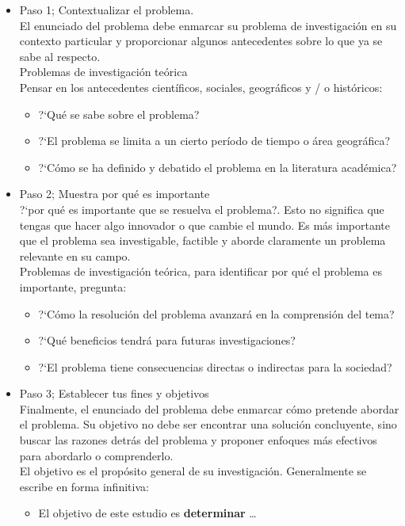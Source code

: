 \documentclass[a4paper,14pt]{article}
\begin{document}
\begin{itemize}
\begin{enumerate}
\begin{itemize}
\begin{itemize}
\item Paso 1; Contextualizar el problema.\\
El enunciado del problema debe enmarcar su problema de investigación en su contexto particular y proporcionar algunos antecedentes sobre lo que ya se sabe al respecto.\\
Problemas de investigación teórica\\
Pensar en los antecedentes científicos, sociales, geográficos y / o históricos:\begin{itemize}
\item ?`Qué se sabe sobre el problema?
\item ?`El problema se limita a un cierto período de tiempo o área geográfica?
\item ?`Cómo se ha definido y debatido el problema en la literatura académica?
\end{itemize}
\item Paso 2; Muestra por qué es importante\\
?`por qué es importante que se resuelva el problema?. Esto no significa que tengas que hacer algo innovador o que cambie el mundo. Es más importante que el problema sea investigable, factible y aborde claramente un problema relevante en su campo.\\
Problemas de investigación teórica, para identificar por qué el problema es importante, pregunta:
\begin{itemize}
\item ?`Cómo la resolución del problema avanzará en la comprensión del tema?
\item ?`Qué beneficios tendrá para futuras investigaciones?
\item ?`El problema tiene consecuencias directas o indirectas para la sociedad?
\end{itemize}
\item Paso 3; Establecer tus fines y objetivos\\
Finalmente, el enunciado del problema debe enmarcar cómo pretende abordar el problema. Su objetivo no debe ser encontrar una solución concluyente, sino buscar las razones detrás del problema y proponer enfoques más efectivos para abordarlo o comprenderlo.\\ El objetivo es el propósito general de su investigación. Generalmente se escribe en forma infinitiva:
\begin{itemize}
\item El objetivo de este estudio es \textbf{determinar} …

\end{itemize}
\end{itemize}
\end{itemize}
\end{enumerate}
\end{itemize}
\end{document}
